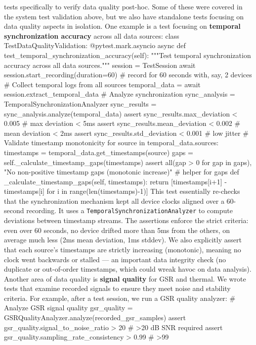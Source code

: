 tests specifically to verify data quality post-hoc. Some of these were covered in the system test validation above, but we also have standalone tests focusing on data quality aspects in isolation. One example is a test focusing on \textbf{temporal synchronization accuracy} across all data sources: class TestDataQualityValidation: @pytest.mark.asyncio async def test_temporal_synchronization_accuracy(self): """Test temporal synchronization accuracy across all data sources.""" session = TestSession await session.start_recording(duration=60) # record for 60 seconds with, say, 2 devices # Collect temporal logs from all sources temporal_data = await session.extract_temporal_data # Analyze synchronization sync_analysis = TemporalSynchronizationAnalyzer sync_results = sync_analysis.analyze(temporal_data) assert sync_results.max_deviation < 0.005 # max deviation < 5ms assert sync_results.mean_deviation < 0.002 # mean deviation < 2ms assert sync_results.std_deviation < 0.001 # low jitter # Validate timestamp monotonicity for source in temporal_data.sources: timestamps = temporal_data.get_timestamps(source) gaps = self._calculate_timestamp_gaps(timestamps) assert all(gap > 0 for gap in gaps), "No non-positive timestamp gaps (monotonic increase)" # helper for gaps def _calculate_timestamp_gaps(self, timestamps): return [timestamps[i+1] - timestamps[i] for i in range(len(timestamps)-1)] This test essentially re-checks that the synchronization mechanism kept all device clocks aligned over a 60-second recording. It uses a \texttt{TemporalSynchronizationAnalyzer} to compute deviations between timestamp streams. The assertions enforce the strict criteria: even over 60 seconds, no device drifted more than 5ms from the others, on average much less (2ms mean deviation, 1ms stddev). We also explicitly assert that each source's timestamps are strictly increasing (monotonic), meaning no clock went backwards or stalled --- an important data integrity check (no duplicate or out-of-order timestamps, which could wreak havoc on data analysis). Another area of data quality is \textbf{signal quality} for GSR and thermal. We wrote tests that examine recorded signals to ensure they meet noise and stability criteria. For example, after a test session, we run a GSR quality analyzer: # Analyze GSR signal quality gsr_quality = GSRQualityAnalyzer.analyze(recorded_gsr_samples) assert gsr_quality.signal_to_noise_ratio > 20 # >20 dB SNR required assert gsr_quality.sampling_rate_consistency > 0.99 # >99%